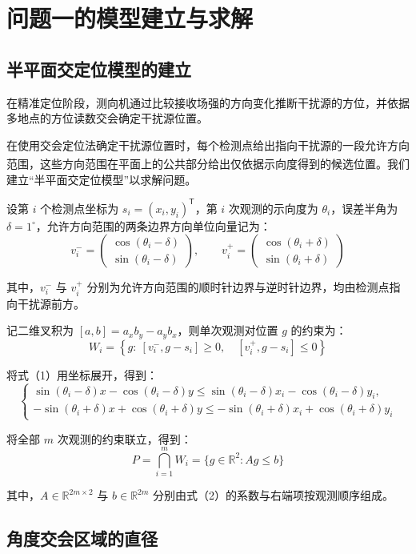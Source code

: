\section{问题一的模型建立与求解}

\subsection{半平面交定位模型的建立}

在精准定位阶段，测向机通过比较接收场强的方向变化推断干扰源的方位，并依据多地点的方位读数交会确定干扰源位置。

在使用交会定位法确定干扰源位置时，每个检测点给出指向干扰源的一段允许方向范围，这些方向范围在平面上的公共部分给出仅依据示向度得到的候选位置\textsuperscript{\cite{ref1}}。我们建立``半平面交定位模型''以求解问题。

设第 \(i\) 个检测点坐标为 \(s_i=(x_i,y_i)^{\mathsf T}\)，第 \(i\) 次观测的示向度为 \(\theta_i\)，误差半角为 \(\delta=1^\circ\)，允许方向范围的两条边界方向单位向量记为：
\[
v_i^-=
\begin{pmatrix}\cos(\theta_i-\delta)\\\sin(\theta_i-\delta)\end{pmatrix},
\qquad
v_i^+=
\begin{pmatrix}\cos(\theta_i+\delta)\\\sin(\theta_i+\delta)\end{pmatrix}
\]

其中，\(v_i^-\) 与 \(v_i^+\) 分别为允许方向范围的顺时针边界与逆时针边界，均由检测点指向干扰源前方。

记二维叉积为 \([a,b]=a_xb_y-a_yb_x\)，则单次观测对位置 \(g\) 的约束为：
\[
W_i=\left\{g:\ [v_i^-,g-s_i]\ge0,\quad[v_i^+,g-s_i]\le0\right\}
\tag{1}
\]

将式（1）用坐标展开，得到：
\[
\begin{cases}
\sin(\theta_i-\delta)x-\cos(\theta_i-\delta)y
\le \sin(\theta_i-\delta)x_i-\cos(\theta_i-\delta)y_i,\\[2mm]
-\sin(\theta_i+\delta)x+\cos(\theta_i+\delta)y
\le-\sin(\theta_i+\delta)x_i+\cos(\theta_i+\delta)y_i
\end{cases}
\tag{2}
\]

将全部 \(m\) 次观测的约束联立，得到：
\[
P=\bigcap_{i=1}^{m}W_i
  =\{g\in\mathbb R^2:Ag\le b\}
\tag{3}
\]

其中，\(A\in\mathbb R^{2m\times2}\) 与 \(b\in\mathbb R^{2m}\) 分别由式（2）的系数与右端项按观测顺序组成。 

\subsection{角度交会区域的直径}

